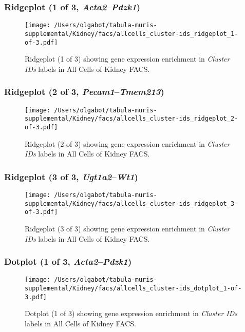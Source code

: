 \clearpage

\subsubsection{Ridgeplot (1 of 3, \emph{Acta2}--\emph{Pdzk1})}
\begin{figure}[h]
\centering
\texttt{[image: /Users/olgabot/tabula-muris-supplemental/Kidney/facs/allcells\_cluster-ids\_ridgeplot\_1-of-3.pdf]}

\caption{ Ridgeplot (1 of 3)  showing gene expression enrichment in \emph{Cluster IDs} labels in All Cells of Kidney FACS. }
\end{figure}


\clearpage

\subsubsection{Ridgeplot (2 of 3, \emph{Pecam1}--\emph{Tmem213})}
\begin{figure}[h]
\centering
\texttt{[image: /Users/olgabot/tabula-muris-supplemental/Kidney/facs/allcells\_cluster-ids\_ridgeplot\_2-of-3.pdf]}

\caption{ Ridgeplot (2 of 3)  showing gene expression enrichment in \emph{Cluster IDs} labels in All Cells of Kidney FACS. }
\end{figure}


\clearpage

\subsubsection{Ridgeplot (3 of 3, \emph{Ugt1a2}--\emph{Wt1})}
\begin{figure}[h]
\centering
\texttt{[image: /Users/olgabot/tabula-muris-supplemental/Kidney/facs/allcells\_cluster-ids\_ridgeplot\_3-of-3.pdf]}

\caption{ Ridgeplot (3 of 3)  showing gene expression enrichment in \emph{Cluster IDs} labels in All Cells of Kidney FACS. }
\end{figure}


\clearpage

\subsubsection{Dotplot (1 of 3, \emph{Acta2}--\emph{Pdzk1})}
\begin{figure}[h]
\centering
\texttt{[image: /Users/olgabot/tabula-muris-supplemental/Kidney/facs/allcells\_cluster-ids\_dotplot\_1-of-3.pdf]}

\caption{ Dotplot (1 of 3)  showing gene expression enrichment in \emph{Cluster IDs} labels in All Cells of Kidney FACS. }
\end{figure}



